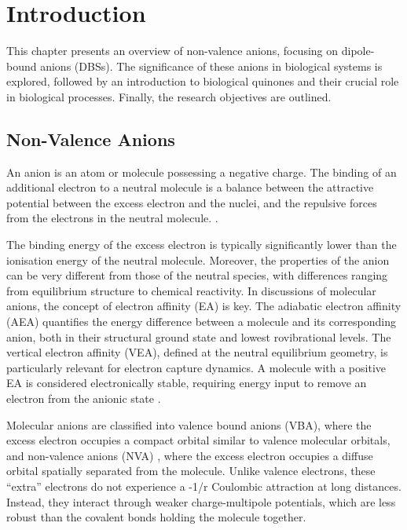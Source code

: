 \chapter{Introduction}\label{ch:introduction}
This chapter presents an overview of non-valence anions, focusing on dipole-bound anions (DBSs). The significance of these anions in biological systems is explored, followed by an introduction to biological quinones and their crucial role in biological processes. Finally, the research objectives are outlined.

\section{Non-Valence Anions}
An anion is an atom or molecule possessing a negative charge. The binding of an additional electron to a neutral molecule is a balance between the attractive potential between the excess electron and the nuclei, and the repulsive forces from the electrons in the neutral molecule.  \cite{simons2008molecular,simons2023molecular,simons2011theoretical,herbert2015quantum}.

The binding energy of the excess electron is typically significantly lower than the ionisation energy of the neutral molecule. Moreover, the properties of the anion can be very different from those of the neutral species, with differences ranging from equilibrium structure to chemical reactivity. In discussions of molecular anions, the concept of electron affinity (EA) is key. The adiabatic electron affinity (AEA) quantifies the energy difference between a molecule and its corresponding anion, both in their structural ground state and lowest rovibrational levels. The vertical electron affinity (VEA), defined at the neutral equilibrium geometry, is particularly relevant for electron capture dynamics. A molecule with a positive EA is considered electronically stable, requiring energy input to remove an electron from the anionic state \cite{simons2008molecular}.

Molecular anions are classified into valence bound anions (VBA), where the excess electron occupies a compact orbital similar to valence molecular orbitals, and non-valence anions (NVA) , where the excess electron occupies a diffuse orbital spatially separated from the molecule. Unlike valence electrons, these ``extra'' electrons do not experience a -1/r Coulombic attraction at long distances. Instead, they interact through weaker charge-multipole potentials, which are less robust than the covalent bonds holding the molecule together\cite{simons2008molecular,herbert2015quantum}.

